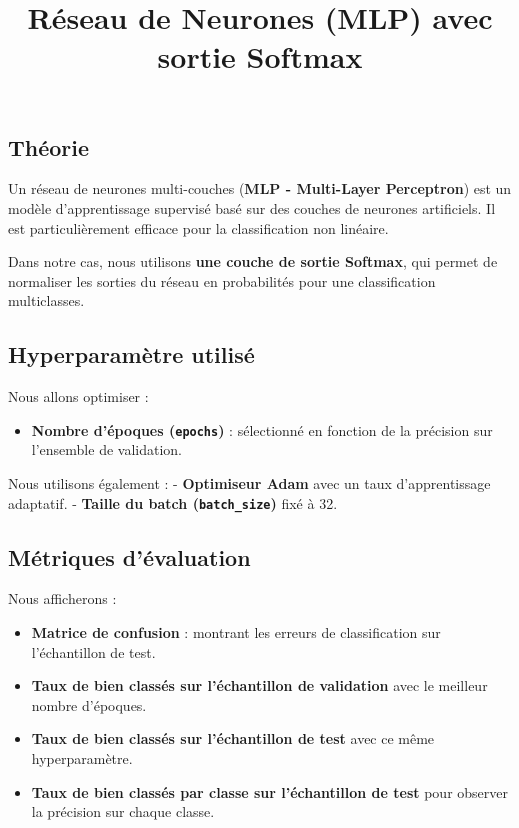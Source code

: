 \documentclass[
  letterpaper,
  DIV=11,
  numbers=noendperiod]{scrartcl}
\title{Réseau de Neurones (MLP) avec sortie Softmax}
\author{}
\date{}
\providecommand{\tightlist}{%
  \setlength{\itemsep}{0pt}\setlength{\parskip}{0pt}}\usepackage{longtable,booktabs,array}
\begin{document}
\maketitle


\subsection{Théorie}\label{thuxe9orie}

Un réseau de neurones multi-couches (\textbf{MLP - Multi-Layer
Perceptron}) est un modèle d'apprentissage supervisé basé sur des
couches de neurones artificiels. Il est particulièrement efficace pour
la classification non linéaire.

Dans notre cas, nous utilisons \textbf{une couche de sortie Softmax},
qui permet de normaliser les sorties du réseau en probabilités pour une
classification multiclasses.

\subsection{Hyperparamètre utilisé}\label{hyperparamuxe8tre-utilisuxe9}

Nous allons optimiser :

\begin{itemize}
\tightlist
\item
  \textbf{Nombre d'époques (\texttt{epochs})} : sélectionné en fonction
  de la précision sur l'ensemble de validation.
\end{itemize}

Nous utilisons également : - \textbf{Optimiseur Adam} avec un taux
d'apprentissage adaptatif. - \textbf{Taille du batch
(\texttt{batch\_size})} fixé à 32.

\subsection{Métriques d'évaluation}\label{muxe9triques-duxe9valuation}

Nous afficherons :

\begin{itemize}
\item
  \textbf{Matrice de confusion} : montrant les erreurs de classification
  sur l'échantillon de test.
\item
  \textbf{Taux de bien classés sur l'échantillon de validation} avec le
  meilleur nombre d'époques.
\item
  \textbf{Taux de bien classés sur l'échantillon de test} avec ce même
  hyperparamètre.
\item
  \textbf{Taux de bien classés par classe sur l'échantillon de test}
  pour observer la précision sur chaque classe.
\end{itemize}
\end{document}
